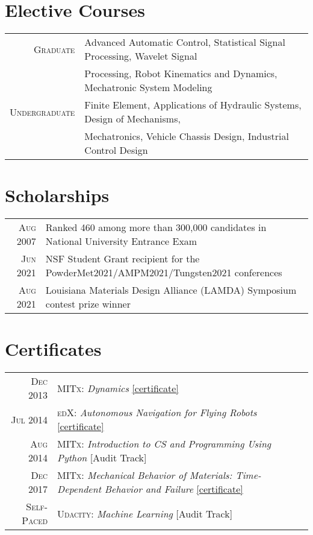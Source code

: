 \documentclass[a4paper,9pt]{article}
\begin{document}




\section{Elective Courses}
\begin{tabular}{rl}
 \textsc{Graduate} & Advanced Automatic Control, Statistical Signal Processing, Wavelet Signal \\
 &  Processing, Robot Kinematics and Dynamics, Mechatronic System Modeling\\
 \textsc{Undergraduate} & Finite Element, Applications of Hydraulic Systems, Design of Mechanisms,\\
 &Mechatronics, Vehicle Chassis Design, Industrial Control Design \\

\end{tabular}



\section{Scholarships}
\begin{tabular}{rl}
 \textsc{Aug} 2007 & Ranked 460 among more than 300,000 candidates in National University Entrance Exam \\
 \textsc{Jun} 2021 & NSF Student Grant recipient for the PowderMet2021/AMPM2021/Tungsten2021 conferences \\
 \textsc{Aug} 2021 & Louisiana Materials Design Alliance (LAMDA) Symposium contest prize winner
\end{tabular}

\section{Certificates}
\begin{tabular}{rl}
 \textsc{Dec} 2013 & \textsc{MITx}: \emph{Dynamics} \href{https://s3.amazonaws.com/verify.edx.org/downloads/49bbb80bd7ca4c8badc48b3886a7a49a/Certificate.pdf}{[certificate]} \\
  \textsc{Jul} 2014 & \textsc{edX}: \emph{Autonomous Navigation for Flying Robots} \href{https://s3.amazonaws.com/verify.edx.org/downloads/0ef9c36ac6a94944ae1274fa6ca1e343/Certificate.pdf}{[certificate]} \\
  \textsc{Aug} 2014 & \textsc{MITx}: \emph{Introduction to CS and Programming Using Python} [Audit Track] \\
\textsc{Dec} 2017 & \textsc{MITx}: \emph{Mechanical Behavior of Materials: Time-Dependent Behavior and Failure} \href{https://courses.edx.org/certificates/95c901d3096340a49b4069f38f6cef17}{[certificate]} \\

\textsc{Self-Paced} & \textsc{Udacity}: \emph{Machine Learning} [Audit Track]
\end{tabular}
\end{document}
